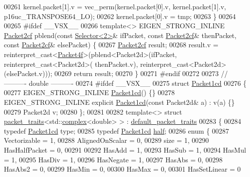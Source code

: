 \begin{DoxyCode}
00261   kernel.packet[1].v = vec\_perm(kernel.packet[0].v, kernel.packet[1].v, p16uc\_TRANSPOSE64\_LO);
00262   kernel.packet[0].v = tmp;
00263 \}
00264 
00265 \textcolor{preprocessor}{#ifdef \_\_VSX\_\_}
00266 \textcolor{keyword}{template}<> EIGEN\_STRONG\_INLINE \hyperlink{struct_eigen_1_1internal_1_1_packet2cf}{Packet2cf} pblend(\textcolor{keyword}{const} \hyperlink{struct_eigen_1_1internal_1_1_selector}{Selector<2>}& ifPacket, \textcolor{keyword}{const} 
      \hyperlink{struct_eigen_1_1internal_1_1_packet2cf}{Packet2cf}& thenPacket, \textcolor{keyword}{const} \hyperlink{struct_eigen_1_1internal_1_1_packet2cf}{Packet2cf}& elsePacket) \{
00267   \hyperlink{struct_eigen_1_1internal_1_1_packet2cf}{Packet2cf} result;
00268   result.v = \textcolor{keyword}{reinterpret\_cast<}\hyperlink{struct_eigen_1_1internal_1_1_packet4f}{Packet4f}\textcolor{keyword}{>}(pblend<Packet2d>(ifPacket, \textcolor{keyword}{reinterpret\_cast<}Packet2d\textcolor{keyword}{>}(
      thenPacket.v), reinterpret\_cast<Packet2d>(elsePacket.v)));
00269   \textcolor{keywordflow}{return} result;
00270 \}
00271 \textcolor{preprocessor}{#endif}
00272 
00273 \textcolor{comment}{//---------- double ----------}
00274 \textcolor{preprocessor}{#ifdef \_\_VSX\_\_}
00275 \textcolor{keyword}{struct }\hyperlink{struct_eigen_1_1internal_1_1_packet1cd}{Packet1cd}
00276 \{
00277   EIGEN\_STRONG\_INLINE \hyperlink{struct_eigen_1_1internal_1_1_packet1cd}{Packet1cd}() \{\}
00278   EIGEN\_STRONG\_INLINE \textcolor{keyword}{explicit} \hyperlink{struct_eigen_1_1internal_1_1_packet1cd}{Packet1cd}(\textcolor{keyword}{const} Packet2d& a) : v(a) \{\}
00279   Packet2d v;
00280 \};
00281 
00282 \textcolor{keyword}{template}<> \textcolor{keyword}{struct }\hyperlink{struct_eigen_1_1internal_1_1packet__traits}{packet\_traits}<std::\hyperlink{structcomplex}{complex}<double> >  : 
      \hyperlink{struct_eigen_1_1internal_1_1default__packet__traits}{default\_packet\_traits}
00283 \{
00284   \textcolor{keyword}{typedef} \hyperlink{struct_eigen_1_1internal_1_1_packet1cd}{Packet1cd} type;
00285   \textcolor{keyword}{typedef} \hyperlink{struct_eigen_1_1internal_1_1_packet1cd}{Packet1cd} \hyperlink{struct_eigen_1_1half}{half};
00286   \textcolor{keyword}{enum} \{
00287     Vectorizable = 1,
00288     AlignedOnScalar = 0,
00289     size = 1,
00290     HasHalfPacket = 0,
00291 
00292     HasAdd    = 1,
00293     HasSub    = 1,
00294     HasMul    = 1,
00295     HasDiv    = 1,
00296     HasNegate = 1,
00297     HasAbs    = 0,
00298     HasAbs2   = 0,
00299     HasMin    = 0,
00300     HasMax    = 0,
00301     HasSetLinear = 0

\end{DoxyCode}
